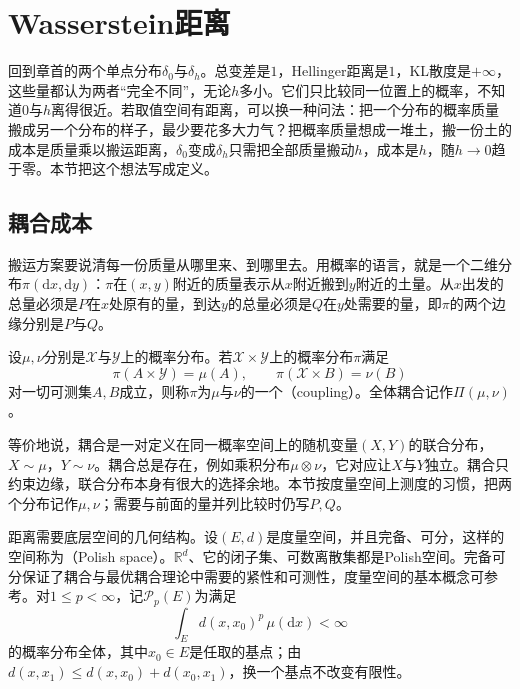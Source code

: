 \section{Wasserstein距离}
\label{sec:dcomp-wasserstein}

回到章首的两个单点分布$\delta_0$与$\delta_h$。总变差是$1$，Hellinger距离是$1$，KL散度是$+\infty$，这些量都认为两者“完全不同”，无论$h$多小。它们只比较同一位置上的概率，不知道$0$与$h$离得很近。若取值空间有距离，可以换一种问法：把一个分布的概率质量搬成另一个分布的样子，最少要花多大力气？把概率质量想成一堆土，搬一份土的成本是质量乘以搬运距离，$\delta_0$变成$\delta_h$只需把全部质量搬动$h$，成本是$h$，随$h\to0$趋于零。本节把这个想法写成定义。

\subsection{耦合成本}
\label{sec:dcomp-coupling-cost}

搬运方案要说清每一份质量从哪里来、到哪里去。用概率的语言，就是一个二维分布$\pi(\mathrm{d}x,\mathrm{d}y)$：$\pi$在$(x,y)$附近的质量表示从$x$附近搬到$y$附近的土量。从$x$出发的总量必须是$P$在$x$处原有的量，到达$y$的总量必须是$Q$在$y$处需要的量，即$\pi$的两个边缘分别是$P$与$Q$。

\begin{definition}[耦合]
\label{def:dcomp-coupling}
设$\mu,\nu$分别是$\mathcal{X}$与$\mathcal{Y}$上的概率分布。若$\mathcal{X}\times\mathcal{Y}$上的概率分布$\pi$满足
\begin{equation}
 \pi(A\times\mathcal{Y})=\mu(A),\qquad\pi(\mathcal{X}\times B)=\nu(B)
 \label{eq:dcomp-coupling-marginals}
\end{equation}
对一切可测集$A,B$成立，则称$\pi$为$\mu$与$\nu$的一个（coupling）。全体耦合记作$\Pi(\mu,\nu)$。
\end{definition}

等价地说，耦合是一对定义在同一概率空间上的随机变量$(X,Y)$的联合分布，$X\sim\mu$，$Y\sim\nu$。耦合总是存在，例如乘积分布$\mu\otimes\nu$，它对应让$X$与$Y$独立。耦合只约束边缘，联合分布本身有很大的选择余地。本节按度量空间上测度的习惯，把两个分布记作$\mu,\nu$；需要与前面的量并列比较时仍写$P,Q$。

距离需要底层空间的几何结构。设$(E,d)$是度量空间，并且完备、可分，这样的空间称为（Polish space）。$\mathbb{R}^{d}$、它的闭子集、可数离散集都是Polish空间。完备可分保证了耦合与最优耦合理论中需要的紧性和可测性，度量空间的基本概念可参考。对$1\leq p<\infty$，记$\mathcal{P}_p(E)$为满足
\begin{equation}
 \int_{E}d(x,x_0)^{p}\,\mu(\mathrm{d}x)<\infty
 \label{eq:dcomp-p-moment}
\end{equation}
的概率分布全体，其中$x_0\in E$是任取的基点；由$d(x,x_1)\leq d(x,x_0)+d(x_0,x_1)$，换一个基点不改变有限性。

